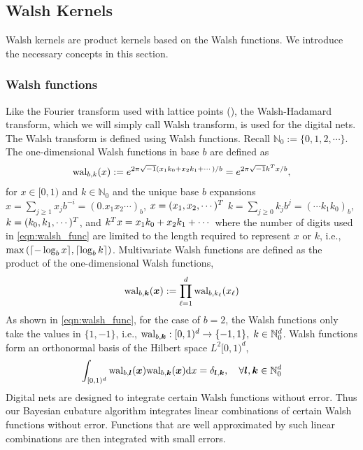 \documentclass{svjour3}                     %
\let\vec\relax
\newcommand{\bm}[1]{\boldsymbol{#1}}
\newcommand{\dif}[1]{\text{d}{#1}}
\newcommand{\naturals}{\mathbb{N}}
\newcommand{\vk}{\bm{k}}
\newcommand{\vl}{\bm{l}}
\newcommand{\vx}{\bm{x}}
\newcommand{\dx}{\dif{{x}}}
\DeclarePairedDelimiter{\ceil}{\lceil}{\rceil}
\begin{document}
\subsection{Walsh Kernels}

Walsh kernels are product kernels based on the Walsh functions. We introduce the necessary concepts in this section.

\subsubsection{Walsh functions}
Like the Fourier transform used with lattice points (\cite{JagHic19a}), the Walsh-Hadamard transform, which we will simply call Walsh transform, is used for the digital nets. The Walsh transform is defined using Walsh functions. Recall $\naturals_0 := \lbrace 0,1,2,\cdots \rbrace$.
The one-dimensional Walsh functions in base $b$ are defined as
\begin{align}
\label{eqn:walsh_func}
\textup{wal}_{b,k}(x) := e^{2\pi \sqrt{-1} (x_1 k_0 + x_2 k_1 + \cdots)/b} 
=
e^{2\pi \sqrt{-1} {\vec{k}}^T{\vec{x}}/b},
\end{align}
for $x \in [0,1)$ and $k \in \naturals_0$ and the unique base $b$ expansions 
$x = \sum_{j \ge 1} x_j b^{-i} = (0.x_1 x_2 \cdots)_b$, $\vec{x} =  (x_1,x_2,\cdots )^T$
$k = \sum_{j \ge 0} k_j b^{j} = ( \cdots k_1 k_0)_b$, $\vec{k} =  (k_0,k_1,\cdots )^T$, and ${\vec{k}}^T{\vec{x}} = x_1 k_0 + x_2 k_1 + \cdots$
where the number of digits used in \eqref{eqn:walsh_func} are limited to the length required to represent $x$ or $k$, i.e., $\max \left( {\ceil{ -\log_b{x}}, \ceil{\log_b{k}}  } \right)$.
Multivariate Walsh functions are defined as the product of the one-dimensional Walsh functions,
\begin{align*}
\textup{wal}_{b,\vk} (\vx) := \prod_{\ell=1}^d \textup{wal}_{b,k_\ell} (x_\ell
)
\end{align*}
As shown in \eqref{eqn:walsh_func}, for the case of $b=2$, the Walsh functions only take the values in $\{1, -1\}$, i.e., $\textup{wal}_{b,\vk} : [0,1)^d \to {\{-1, 1\}} , \; k \in \naturals_0^d$. Walsh functions form an orthonormal basis of the Hilbert space $L^2[0,1)^d$,
\begin{align*}
\int_{[0,1)^d}
\textup{wal}_{b,\vl} (\vx) \textup{wal}_{b,\vk}(\vx) \dx = \delta_{\vl, \vk}, \quad \forall \vl, \vk \in \naturals_0^d
\end{align*}
Digital nets are designed to integrate certain Walsh functions without error.
Thus our Bayesian cubature algorithm integrates linear combinations of %
certain Walsh functions without error. Functions that are well approximated by such linear combinations are then integrated with small errors.
\end{document}
